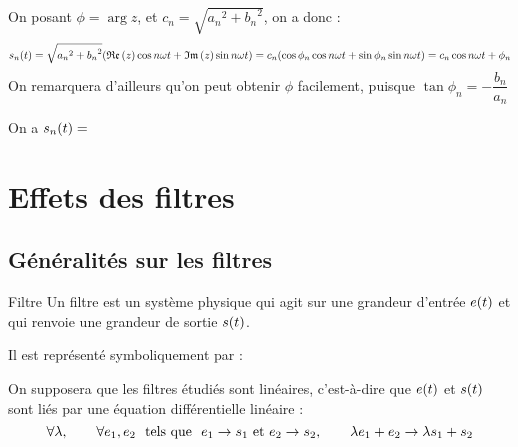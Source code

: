 \documentclass[a4paper,french,bookmarks]{book}
\begin{document}
    On posant $\phi = \arg z$, et $c_n = \sqrt{{a_n}^2 + {b_n}^2}$, on a donc :
    \[ s_n\p{t} = \sqrt{{a_n}^2 + {b_n}^2} \p{\Re{z}\cos{n\omega t} + \Im{z}\sin{n \omega t}} = c_n\p{\cos{\phi_n}\cos{n\omega t} + \sin{\phi_n}\sin{n\omega t}} = c_n\cos{n\omega t + \phi_n}\]
    On remarquera d'ailleurs qu'on peut obtenir $\phi$ facilement, puisque $\tan \phi_n = -\dfrac{b_n}{a_n}$
    \begin{enumerate}
        \itt On a $s_n\!\left(t\right) =$
    \end{enumerate}
    
    \section{Effets des filtres}
    
    \subsection{Généralités sur les filtres}
    
    \begin{definition}{Filtre}{}
        Un filtre est un système physique qui agit sur une grandeur d'entrée $e\!\left(t\right)$ et qui renvoie une grandeur de sortie $s\!\left(t\right)$.
    \end{definition}
    
    Il est représenté symboliquement par :
    \begin{center}
    \end{center}
    
    On supposera que les filtres étudiés sont linéaires, c'est-à-dire que $e\!\left(t\right)$ et $s\!\left(t\right)$ sont liés par une équation différentielle linéaire :
    \[ \forall \lambda,\qquad \forall e_1, e_2 \ \text{ tels que } \ e_1 \rightarrow s_1 \ \text{et} \  e_2 \rightarrow s_2,\qquad \lambda e_1 + e_2 \rightarrow \lambda s_1 + s_2\]

    
\end{document}

